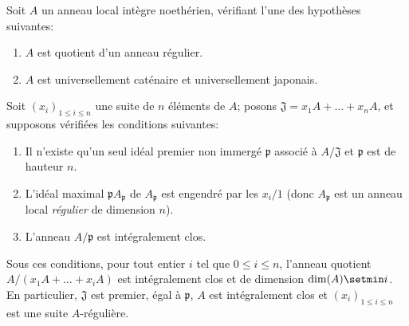\begin{corollary}[5.12.10]
\label{IV.2.s5.12.10-fr}
Soit $A$ un anneau local intègre noethérien, vérifiant l'une des hypothèses
suivantes:
\begin{enumerate}
\item[\textup{a)}] $A$ est quotient d'un anneau régulier.
\item[\textup{b)}] $A$ est universellement caténaire et universellement japonais.
\end{enumerate}
Soit $(x_i)_{1\leq i\leq n}$ une suite de $n$ éléments de $A$; posons
$\mathfrak J=x_1A+\ldots+x_nA$, et supposons vérifiées les conditions
suivantes:
\begin{enumerate}
\item[\textup{(i)}] Il n'existe qu'un seul idéal premier non immergé $\mathfrak p$
associé à $A/\mathfrak J$ et $\mathfrak p$ est de hauteur $n$.
\item[\textup{(ii)}] L'idéal maximal $\mathfrak pA_{\mathfrak p}$ de $A_{\mathfrak p}$
est engendré par les $x_i/1$ \textup{(donc $A_{\mathfrak p}$ est un anneau local
\emph{régulier} de dimension $n$)}.
\item[\textup{(iii)}] L'anneau $A/\mathfrak p$ est intégralement clos.
\end{enumerate}
Sous ces conditions, pour tout entier $i$ tel que $0\leq i\leq n$, l'anneau
quotient $A/(x_1A+\ldots+x_iA)$ est intégralement clos et de dimension
$\dim(A)\setmin i$. En particulier, $\mathfrak J$ est premier, égal à $\mathfrak p$,
$A$ est intégralement clos et $(x_i)_{1\leq i\leq n}$ est une suite
$A$-régulière.
\end{corollary}


